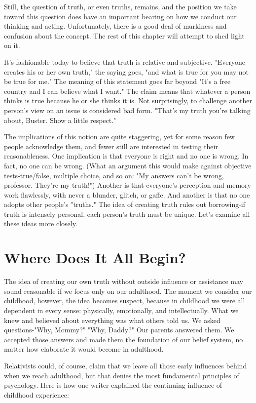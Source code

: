 \documentclass{book}
\begin{document}
Still, the question of truth, or even truths, remains, and the position we take toward this question does have an important bearing on how we conduct our thinking and acting. Unfortunately, there is a good deal of murkiness and confusion about the concept. The rest of this chapter will attempt to shed light on it.

It’s fashionable today to believe that truth is relative and subjective.  "Everyone creates his or her own truth," the saying goes, "and what is true for you may not be true for me." The meaning of this statement goes far beyond "It’s a free country and I can believe what I want." The claim means that whatever a person thinks is true because he or she thinks it is. Not surprisingly, to challenge another person’s view on an issue is considered bad form. "That’s my truth you’re talking about, Buster. Show a little respect."

The implications of this notion are quite staggering, yet for some reason few people acknowledge them, and fewer still are interested in testing their reasonableness. One implication is that everyone is right and no one is wrong. In fact, no one can be wrong. (What an argument this would make against objective tests-true/false, multiple choice, and so on: "My answers can’t be wrong, professor. They’re my truth!") Another is that everyone’s perception and memory work flawlessly, with never a blunder, glitch, or gaffe. And another is that no one adopts other people’s "truths." The idea of creating truth rules out borrowing-if truth is intensely personal, each person’s truth must be unique. Let’s examine all these ideas more closely.

\section{Where Does It All Begin?}

The idea of creating our own truth without outside influence or assistance may sound reasonable if we focus only on our adulthood. The moment we consider our childhood, however, the idea becomes suspect, because in childhood we were all dependent in every sense: physically, emotionally, and intellectually. What we knew and believed about everything was what others told us. We asked questions-"Why, Mommy?" "Why, Daddy?" Our parents answered them. We accepted those answers and made them the foundation of our belief system, no matter how elaborate it would become in adulthood.

Relativists could, of course, claim that we leave all those early influences behind when we reach adulthood, but that denies the most fundamental principles of psychology. Here is how one writer explained the continuing influence of childhood experience:
\end{document}
